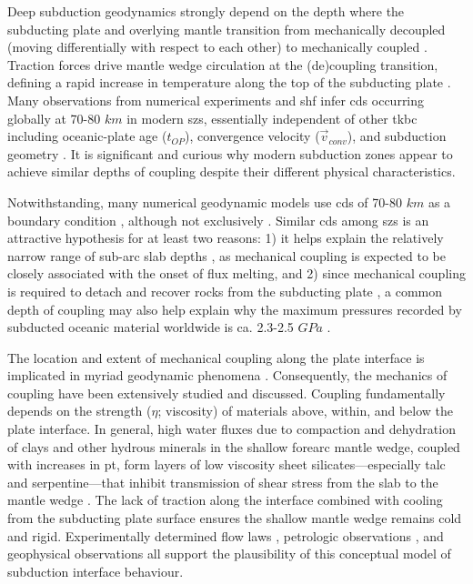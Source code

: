 Deep subduction geodynamics strongly depend on the depth where the subducting plate and overlying mantle transition from mechanically decoupled (moving differentially with respect to each other) to mechanically coupled \citep[moving with the same local velocity,][]{Furukawa1993, Peacock1994, Wada2008}. Traction forces drive mantle wedge circulation at the (de)coupling transition, defining a rapid increase in temperature along the top of the subducting plate \citep{Peacock1996}. Many observations from numerical experiments and \gls{shf} infer \glspl{cd} occurring globally at 70-80 \(km\) in modern \glspl{sz}, essentially independent of other \gls{tkbc} including oceanic-plate age (\(t_{OP}\)), convergence velocity (\(\vec{v}_{conv}\)), and subduction geometry \citep{Furukawa1993, Wada2008, Wada2009}. It is significant and curious why modern subduction zones appear to achieve similar depths of coupling despite their different physical characteristics.

Notwithstanding, many numerical geodynamic models use \glspl{cd} of 70-80 \(km\) as a boundary condition \citep[e.g.,][]{Abers2017, Currie2004, Syracuse2010, VanKeken2011, VanKeken2018, Wada2012, Gao2014, Wilson2014}, although not exclusively \citep[e.g.~40-56 \(km\),][]{England2010, Peacock1996}. Similar \glspl{cd} among \glspl{sz} is an attractive hypothesis for at least two reasons: 1) it helps explain the relatively narrow range of sub-arc slab depths \citep{England2004, Syracuse2006}, as mechanical coupling is expected to be closely associated with the onset of flux melting, and 2) since mechanical coupling is required to detach and recover rocks from the subducting plate \citep{Agard2016}, a common depth of coupling may also help explain why the maximum pressures recorded by subducted oceanic material worldwide is ca. 2.3-2.5 \(GPa\) \citep[roughly 80 \(km\),][]{Agard2009}.

The location and extent of mechanical coupling along the plate interface is implicated in myriad geodynamic phenomena \citep[seismicity, metamorphism, volatile fluxes into the mantle wedge, volcanism, and plate motions, e.g.,][]{Cizkova2013, Gonzalez2016, Peacock1990, Peacock1991, Peacock1993, Peacock1996, Peacock1999a, Hacker2003, VanKeken2011, Grove2012, Gao2017}. Consequently, the mechanics of coupling have been extensively studied and discussed. Coupling fundamentally depends on the strength (\(\eta\); viscosity) of materials above, within, and below the plate interface. In general, high water fluxes due to compaction and dehydration of clays and other hydrous minerals in the shallow forearc mantle wedge, coupled with increases in \gls{pt}, form layers of low viscosity sheet silicates---especially talc and serpentine---that inhibit transmission of shear stress from the slab to the mantle wedge \citep{Peacock1999a}. The lack of traction along the interface combined with cooling from the subducting plate surface ensures the shallow mantle wedge remains cold and rigid. Experimentally determined flow laws \citep[e.g.,][]{Agard2016}, petrologic observations \citep[e.g.,][]{Agard2016}, and geophysical observations \citep[e.g.,][]{Gao2014, Peacock1999a} all support the plausibility of this conceptual model of subduction interface behaviour.

